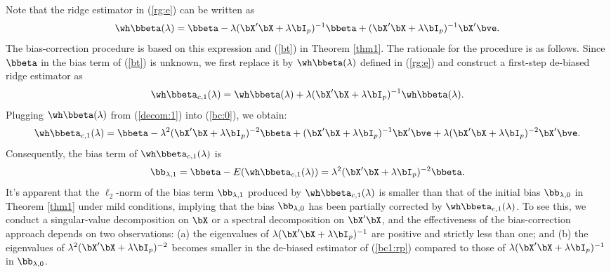 Note that the ridge estimator in (\ref{rg:e}) can be written as
\begin{equation}\label{decom:1}
    \wh\bbeta(\lambda)=\bbeta-\lambda(\bX'\bX+\lambda\bI_p)^{-1}\bbeta+(\bX'\bX+\lambda\bI_p)^{-1}\bX'\bve.
\end{equation}
The bias-correction procedure is based on  this expression and (\ref{bt}) in Theorem \ref{thm1}. The rationale for the procedure is as follows. Since $\bbeta$ in the bias term of (\ref{bt}) is unknown, we first replace it by $\wh\bbeta(\lambda)$ defined in (\ref{rg:e}) and construct a first-step de-biased ridge estimator as
 \begin{equation}\label{bc:0}
\wh\bbeta_{c,1}(\lambda)=\wh\bbeta(\lambda)+\lambda(\bX'\bX+\lambda\bI_p)^{-1}\wh\bbeta(\lambda).
 \end{equation}
Plugging $\wh\bbeta(\lambda)$ from (\ref{decom:1}) into (\ref{bc:0}), we obtain:
\begin{equation}\label{bc1:rp}
    \wh\bbeta_{c,1}(\lambda)=\bbeta-\lambda^2(\bX'\bX+\lambda\bI_p)^{-2}\bbeta+(\bX'\bX+\lambda\bI_p)^{-1}\bX'\bve+\lambda(\bX'\bX+\lambda\bI_p)^{-2}\bX'\bve.
\end{equation}
Consequently, the bias term of $\wh\bbeta_{c,1}(\lambda)$ is
\begin{equation}\label{bc:1}
     \bb_{\lambda,1}=\bbeta-E(\wh\bbeta_{c,1}(\lambda))=\lambda^2(\bX'\bX+\lambda\bI_p)^{-2}\bbeta.
 \end{equation}
It's apparent that the $\ell_2$-norm of the bias term $\bb_{\lambda,1}$ produced by $\wh\bbeta_{c,1}(\lambda)$ is smaller than that of the initial bias $\bb_{\lambda,0}$ in Theorem \ref{thm1} under mild conditions, implying that the bias  $\bb_{\lambda,0}$ has been partially corrected by $\wh\bbeta_{c,1}(\lambda)$. To see this, we conduct a singular-value decomposition on $\bX$ or a spectral decomposition on $\bX'\bX$, and the effectiveness of the bias-correction approach depends on two observations: (a) the eigenvalues of $\lambda(\bX'\bX+\lambda\bI_p)^{-1}$ are positive and strictly less than one; and (b) the eigenvalues of $\lambda^2(\bX'\bX+\lambda\bI_p)^{-2}$ becomes smaller in the de-biased estimator of (\ref{bc1:rp}) compared to those of  $\lambda(\bX'\bX+\lambda\bI_p)^{-1}$ in $\bb_{\lambda,0}$.


